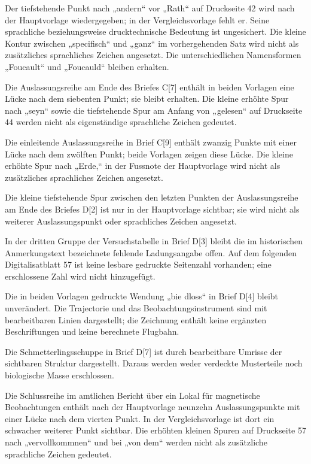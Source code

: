 Der tiefstehende Punkt nach „andern“ vor „Rath“ auf Druckseite 42 wird nach der Hauptvorlage wiedergegeben; in der Vergleichsvorlage fehlt er. Seine sprachliche beziehungsweise drucktechnische Bedeutung ist ungesichert. Die kleine Kontur zwischen „specifisch“ und „ganz“ im vorhergehenden Satz wird nicht als zusätzliches sprachliches Zeichen angesetzt. Die unterschiedlichen Namensformen „Foucault“ und „Foucauld“ bleiben erhalten.

Die Auslassungsreihe am Ende des Briefes C[7] enthält in beiden Vorlagen eine Lücke nach dem siebenten Punkt; sie bleibt erhalten. Die kleine erhöhte Spur nach „seyn“ sowie die tiefstehende Spur am Anfang von „gelesen“ auf Druckseite 44 werden nicht als eigenständige sprachliche Zeichen gedeutet.

Die einleitende Auslassungsreihe in Brief C[9] enthält zwanzig Punkte mit einer Lücke nach dem zwölften Punkt; beide Vorlagen zeigen diese Lücke. Die kleine erhöhte Spur nach „Erde,“ in der Fussnote der Hauptvorlage wird nicht als zusätzliches sprachliches Zeichen angesetzt.

Die kleine tiefstehende Spur zwischen den letzten Punkten der Auslassungsreihe am Ende des Briefes D[2] ist nur in der Hauptvorlage sichtbar; sie wird nicht als weiterer Auslassungspunkt oder sprachliches Zeichen angesetzt.

In der dritten Gruppe der Versuchstabelle in Brief D[3] bleibt die im historischen Anmerkungstext bezeichnete fehlende Ladungsangabe offen. Auf dem folgenden Digitalisatblatt 57 ist keine lesbare gedruckte Seitenzahl vorhanden; eine erschlossene Zahl wird nicht hinzugefügt.

Die in beiden Vorlagen gedruckte Wendung „bie dloss“ in Brief D[4] bleibt unverändert. Die Trajectorie und das Beobachtungsinstrument sind mit bearbeitbaren Linien dargestellt; die Zeichnung enthält keine ergänzten Beschriftungen und keine berechnete Flugbahn.

Die Schmetterlingsschuppe in Brief D[7] ist durch bearbeitbare Umrisse der sichtbaren Struktur dargestellt. Daraus werden weder verdeckte Musterteile noch biologische Masse erschlossen.

Die Schlussreihe im amtlichen Bericht über ein Lokal für magnetische Beobachtungen enthält nach der Hauptvorlage neunzehn Auslassungspunkte mit einer Lücke nach dem vierten Punkt. In der Vergleichsvorlage ist dort ein schwacher weiterer Punkt sichtbar. Die erhöhten kleinen Spuren auf Druckseite 57 nach „vervollkommnen“ und bei „von dem“ werden nicht als zusätzliche sprachliche Zeichen gedeutet.

